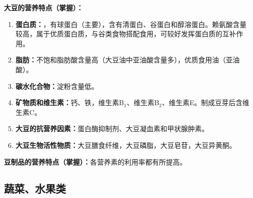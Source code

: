 \begin{keybox}
\textbf{大豆的营养特点（掌握）：}
\begin{enumerate}[leftmargin=*]
    \item \textbf{蛋白质：}，有球蛋白（主要），含有清蛋白、谷蛋白和醇溶蛋白。赖氨酸含量较高，属于优质蛋白质，与谷类食物搭配食用，可较好发挥蛋白质的互补作用。
    \item \textbf{脂肪：}不饱和脂肪酸含量高（大豆油中亚油酸含量多），优质食用油（亚油酸）。
    \item \textbf{碳水化合物：}淀粉含量低。
    \item \textbf{矿物质和维生素：}钙、铁，维生素B$_1$、维生素B$_2$、维生素E。制成豆芽后含维生素C。
    \item \textbf{大豆的抗营养因素：}蛋白酶抑制剂、大豆凝血素和甲状腺肿素。
    \item \textbf{大豆生物活性物质：}大豆膳食纤维，大豆磷脂，大豆皂苷，大豆异黄酮。
\end{enumerate}

\vspace{4pt}
\textbf{豆制品的营养特点（掌握）：}各营养素的利用率都有所提高。
\end{keybox}

\subsection{蔬菜、水果类}

